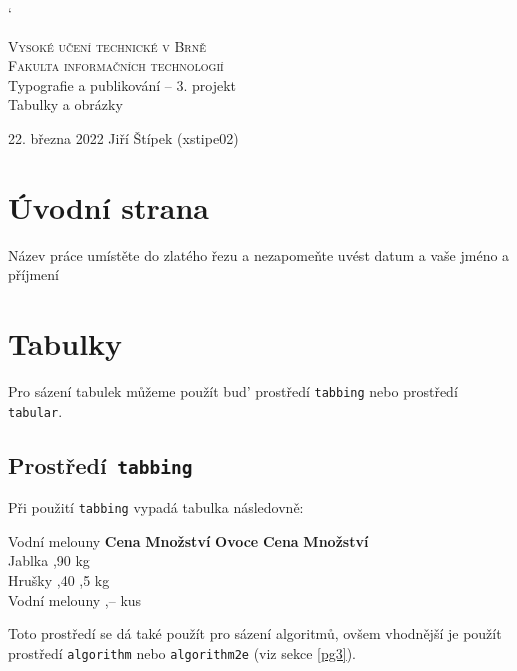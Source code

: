 \documentclass[a4paper, 11pt]{article}
\begin{document}
\catcode`
\begin{titlepage}
\begin{center}

    {\Huge \textsc{Vysoké učení technické v Brně}}\\[0.4em]
    {\huge \textsc{Fakulta informačních technologií}}\\
    {\LARGE Typografie a publikování -- 3. projekt\\[0.3em]
    {\Huge Tabulky a obrázky}}
\end{center}
{\Large 22. března 2022 \hfill Jiří Štípek (xstipe02)}
\end{titlepage}
\newpage
\section{Úvodní strana}
Název práce umístěte do zlatého řezu a nezapomeňte uvést  datum a vaše jméno a příjmení
\section{Tabulky}
Pro sázení tabulek můžeme použít bud’ prostředí \verb-tabbing- nebo prostředí \verb-tabular-.
\subsection{Prostředí\texttt{ tabbing}}
Při použití \verb-tabbing- vypadá tabulka následovně:
\begin{tabbing}
		Vodní melouny \quad	\= \textbf{Cena} \quad	\= \textbf{Množství}	\kill
		\textbf{Ovoce}		\> \textbf{Cena}		\> \textbf{Množství}	\\
		Jablka				,90				 kg					\\
		Hrušky				,40				,5 kg				\\
		Vodní melouny		,--				 kus				\\
\end{tabbing}
Toto prostředí se dá také použít pro sázení algoritmů, ovšem vhodnější je použít prostředí \verb-algorithm- nebo
\verb-algorithm2e- \;(viz sekce \ref{pg3}).
\end{document}
